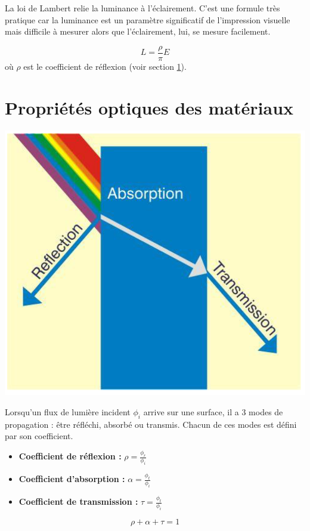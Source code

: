 \documentclass[11pt]{report}
\begin{document}
\vspace{1cm}
La loi de Lambert relie la luminance à l'éclairement. C'est une formule très pratique car la luminance est un paramètre significatif de l'impression visuelle mais difficile à mesurer alors que l'éclairement, lui, se mesure facilement.

$$L = \frac{\rho}{\pi}E$$
où $\rho$ est le coefficient de réflexion (voir section \ref{reflex}). 






\newpage
\section{Propriétés optiques des matériaux}
\label{reflex}
\begin{minipage}{0.4\linewidth}
\centering
\includegraphics[scale=0.3]{prop}
\end{minipage}
\begin{minipage}{0.6\linewidth}
Lorsqu'un flux de lumière  incident $\phi_i$ arrive sur une surface, il a 3 modes de propagation : être réfléchi, absorbé ou transmis. Chacun de ces modes est défini par son coefficient.
\begin{itemize}
\item \textbf{Coefficient de réflexion :} $\rho= \frac{\phi_r}{\phi_i}$
\item \textbf{Coefficient d'absorption :} $\alpha= \frac{\phi_t}{\phi_i}$
\item \textbf{Coefficient de transmission :} $\tau= \frac{\phi_t}{\phi_i}$
\end{itemize}
$$\rho + \alpha + \tau = 1$$
\end{minipage}
\end{document}
